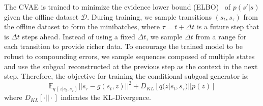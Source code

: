 The CVAE is trained to minimize the evidence lower bound (ELBO)~\cite{kingma2014vae} of $p(s' | s)$ given the offline dataset $\mathcal{D}$. During training, we sample transitions $(s_t, s_{\tau})$ from the offline dataset to form the minibatches, where $\tau = t + \Delta t$ is a future step that is $\Delta t$ steps ahead. Instead of using a fixed $\Delta t$, we sample $\Delta t$ from a range for each transition to provide richer data. To encourage the trained model to be robust to compounding errors, we sample sequences composed of multiple states and use the subgoal reconstructed at the previous step as the context in the next step. Therefore, the objective for training the conditional subgoal generator is:
\begin{equation}
    \mathbb{E}_{q(z | s_t, s_{\tau})}||s_{\tau} - g(s_t, z)||^2 + \ensuremath{D_{KL}[q(z | s_t, s_{\tau}) || p(z)]}
    \label{eqn:elbo}
\end{equation}
where $\ensuremath{D_{KL}[\cdot || \cdot]}$ indicates the KL-Divergence.



